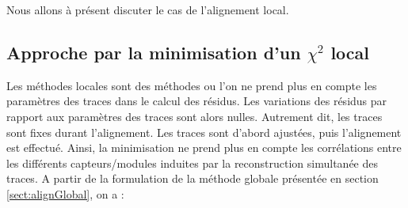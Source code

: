 

   

   \medskip
   
   Nous allons \`a pr\'esent discuter le cas de l'alignement local.
   
   \subsection{Approche par la minimisation d'un $\chi^2$ local}
   
   Les m\'ethodes locales sont des m\'ethodes ou l'on ne prend plus en compte les param\`etres des traces dans le calcul des r\'esidus. Les variations des r\'esidus par rapport aux param\`etres des traces sont alors nulles. Autrement dit, les traces sont fixes durant l'alignement. Les traces sont d'abord ajust\'ees, puis l'alignement est effectu\'e. Ainsi, la minimisation ne prend plus en compte les corr\'elations entre les diff\'erents capteurs/modules induites par la reconstruction simultan\'ee des traces. A partir de la formulation de la m\'ethode globale pr\'esent\'ee en section \ref{sect:alignGlobal}, on a :
   
